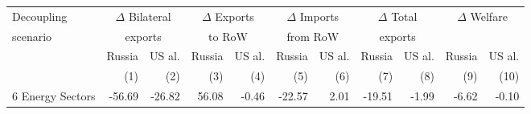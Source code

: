 \begin{tabular}{lrrrrrrrrrr}
  \hline
  Decoupling & \multicolumn{2}{c}{$\Delta$ Bilateral} & \multicolumn{2}{c}{$\Delta$ Exports} & \multicolumn{2}{c}{$\Delta$ Imports} & \multicolumn{2}{c}{$\Delta$ Total} & \multicolumn{2}{c}{$\Delta$ Welfare}\\
scenario & \multicolumn{2}{c}{exports} & \multicolumn{2}{c}{to RoW} & \multicolumn{2}{c}{from RoW} & \multicolumn{2}{c}{exports} & }\\\cmidrule{2-11}
& Russia & US al. & Russia & US al. & Russia & US al. & Russia & US al. & Russia & US al.} \\
& (1) & (2) & (3) & (4) & (5) & (6) & (7) & (8) & (9) & (10)} \\
 \hline
6 Energy Sectors & -56.69 & -26.82 & 56.08 & -0.46 & -22.57 & 2.01 & -19.51 & -1.99 & -6.62 & -0.10 \\ 
   \hline
\end{tabular}
